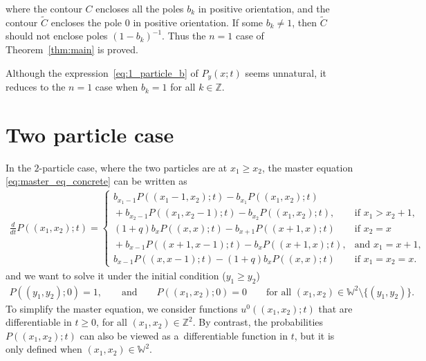 \documentclass[pdftex]{sigma}
\numberwithin{equation}{section}
\newcommand{\intZ}{\mathbb{Z}}
\newcommand{\Weylchamber}{\mathbb{W}}
\begin{document}
where the contour $C$ encloses all the poles $b_k$ in positive orientation, and the contour $\tilde{C}$ encloses the pole $0$ in positive orientation. If some $b_k \neq 1$, then $\tilde{C}$ should not enclose poles $(1 - b_k)^{-1}$. Thus the $n = 1$ case of Theorem~\ref{thm:main} is proved.

\begin{Remark}
 Although the expression~\eqref{eq:1_particle_b} of $P_y(x; t)$ seems unnatural, it reduces to the $n = 1$ case \cite[Theorem~2.1]{Korhonen-Lee14} when $b_k = 1$ for all $k \in \intZ$.
\end{Remark}

\section{Two particle case} \label{sec:2_particle_case}

In the $2$-particle case, where the two particles are at $x_1 \geq x_2$, the master equation \eqref{eq:master_eq_concrete} can be written as
\begin{gather} \label{eq:master_eq_2_particles}
 \frac{d}{dt} P((x_1, x_2); t) =
 \begin{cases}
 b_{x_1 - 1} P((x_1 - 1, x_2); t) - b_{x_1} P((x_1, x_2); t) & \\
{} + b_{x_2 - 1} P((x_1, x_2 - 1); t) - b_{x_2} P((x_1, x_2); t),
 & \text{if $x_1 > x_2 + 1$}, \\
 (1 + q) b_xP((x, x); t) - b_{x + 1} P((x + 1, x); t) & \text{if $x_2 = x$} \\
{} + b_{x - 1} P((x + 1, x - 1); t) - b_x P((x + 1, x); t),
& \text{and $x_1 = x + 1$}, \\
 b_{x - 1} P((x, x - 1); t) - (1 + q) b_x P((x, x); t) & \text{if $x_1 = x_2 = x$}.
 \end{cases}\!\!\!\!
\end{gather}
and we want to solve it under the initial condition ($y_1 \geq y_2$)
\begin{gather} \label{eq:init_C_2_particles}
 P((y_1, y_2); 0) = 1, \qquad \text{and} \qquad P((x_1, x_2); 0) = 0 \qquad \text{for all $(x_1, x_2) \in \Weylchamber^2 {\setminus} \{ (y_1, y_2) \}$}.\!\!\!
\end{gather}
To simplify the master equation, we consider functions $u^0((x_1, x_2); t)$ that are dif\/ferentiable in $t \geq 0$, for all $(x_1, x_2) \in \intZ^2$. By contrast, the probabilities $P((x_1, x_2); t)$ can also be viewed as a~dif\/ferentiable function in $t$, but it is only def\/ined when $(x_1, x_2) \in \Weylchamber^2$.
\end{document}
